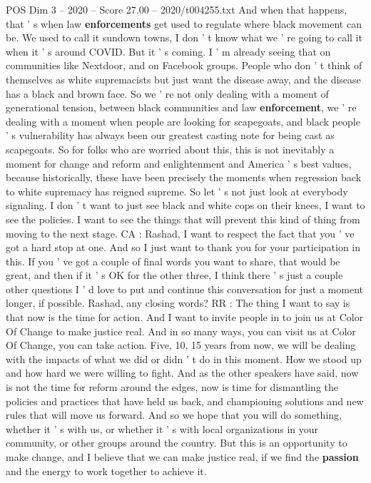 \begin{textsample}{POS Dim 3 – 2020 – Score 27.00 – 2020/t004255.txt}
And when that happens, that ' s when law \textbf{enforcements} get used to regulate where black movement can be.
We used to call it sundown towns, I don ' t know what we ' re going to call it when it ' s around COVID.
But it ' s coming.
I ' m already seeing that on communities like Nextdoor, and on Facebook groups.
People who don ' t think of themselves as white supremacists but just want the disease away, and the disease has a black and brown face.
So we ' re not only dealing with a moment of generational tension, between black communities and law \textbf{enforcement}, we ' re dealing with a moment when people are looking for scapegoats, and black people ' s vulnerability has always been our greatest casting note for being cast as scapegoats.
So for folks who are worried about this, this is not inevitably a moment for change and reform and enlightenment and America ' s best values, because historically, these have been precisely the moments when regression back to white supremacy has reigned supreme.
So let ' s not just look at everybody signaling.
I don ' t want to just see black and white cops on their knees, I want to see the policies.
I want to see the things that will prevent this kind of thing from moving to the next stage.
CA : Rashad, I want to respect the fact that you ' ve got a hard stop at one.
And so I just want to thank you for your participation in this.
If you ' ve got a couple of final words you want to share, that would be great, and then if it ' s OK for the other three, I think there ' s just a couple other questions I ' d love to put and continue this conversation for just a moment longer, if possible.
Rashad, any closing words?
RR : The thing I want to say is that now is the time for action.
And I want to invite people in to join us at Color Of Change to make justice real.
And in so many ways, you can visit us at Color Of Change, you can take action.
Five, 10, 15 years from now, we will be dealing with the impacts of what we did or didn ' t do in this moment.
How we stood up and how hard we were willing to fight.
And as the other speakers have said, now is not the time for reform around the edges, now is time for dismantling the policies and practices that have held us back, and championing solutions and new rules that will move us forward.
And so we hope that you will do something, whether it ' s with us, or whether it ' s with local organizations in your community, or other groups around the country.
But this is an opportunity to make change, and I believe that we can make justice real, if we find the \textbf{passion} and the energy to work together to achieve it.

\end{textsample}

